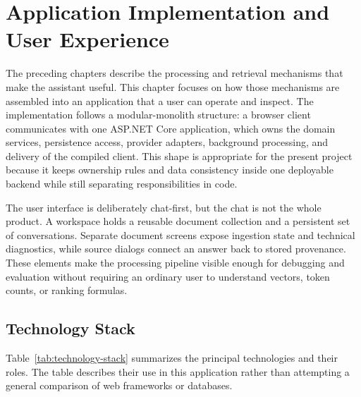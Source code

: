 \chapter{Application Implementation and User Experience}
\label{chap:application-ux}

The preceding chapters describe the processing and retrieval mechanisms that make the assistant useful. This chapter focuses on how those mechanisms are assembled into an application that a user can operate and inspect. The implementation follows a modular-monolith structure: a browser client communicates with one ASP.NET Core application, which owns the domain services, persistence access, provider adapters, background processing, and delivery of the compiled client. This shape is appropriate for the present project because it keeps ownership rules and data consistency inside one deployable backend while still separating responsibilities in code.

The user interface is deliberately chat-first, but the chat is not the whole product. A workspace holds a reusable document collection and a persistent set of conversations. Separate document screens expose ingestion state and technical diagnostics, while source dialogs connect an answer back to stored provenance. These elements make the processing pipeline visible enough for debugging and evaluation without requiring an ordinary user to understand vectors, token counts, or ranking formulas.

\section{Technology Stack}
\label{sec:technology-stack}

Table~\ref{tab:technology-stack} summarizes the principal technologies and their roles. The table describes their use in this application rather than attempting a general comparison of web frameworks or databases.

